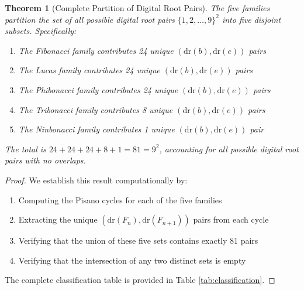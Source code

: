 \documentclass[12pt]{article}
\newtheorem{theorem}{Theorem}
\begin{document}
\begin{theorem}[Complete Partition of Digital Root Pairs]\label{thm:main}
The five families partition the set of all possible digital root pairs $\{1, 2, \ldots, 9\}^2$ into five disjoint subsets. Specifically:

\begin{enumerate}
\item The Fibonacci family contributes 24 unique $(\text{dr}(b), \text{dr}(e))$ pairs
\item The Lucas family contributes 24 unique $(\text{dr}(b), \text{dr}(e))$ pairs
\item The Phibonacci family contributes 24 unique $(\text{dr}(b), \text{dr}(e))$ pairs
\item The Tribonacci family contributes 8 unique $(\text{dr}(b), \text{dr}(e))$ pairs
\item The Ninbonacci family contributes 1 unique $(\text{dr}(b), \text{dr}(e))$ pair
\end{enumerate}

The total is $24 + 24 + 24 + 8 + 1 = 81 = 9^2$, accounting for all possible digital root pairs with \emph{no overlaps}.
\end{theorem}

\begin{proof}
We establish this result computationally by:
\begin{enumerate}
\item Computing the Pisano cycles for each of the five families
\item Extracting the unique $(\text{dr}(F_n), \text{dr}(F_{n+1}))$ pairs from each cycle
\item Verifying that the union of these five sets contains exactly 81 pairs
\item Verifying that the intersection of any two distinct sets is empty
\end{enumerate}

The complete classification table is provided in Table \ref{tab:classification}.
\end{proof}
\end{document}
